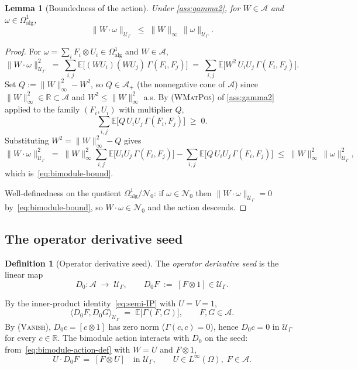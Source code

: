 \documentclass[11pt,reqno]{amsart}
\theoremstyle{plain}
\newtheorem{lemma}[theorem]{Lemma}
\theoremstyle{definition}
\newtheorem{definition}[theorem]{Definition}
\theoremstyle{remark}
\newcommand{\R}{\mathbb{R}}
\newcommand{\E}{\mathbb{E}}
\newcommand{\cA}{\mathcal A}
\newcommand{\cU}{\mathcal U}
\begin{document}
\begin{lemma}[Boundedness of the action]\label{lem:bimodule-bounded}
Under \cref{ass:gamma2}, for $W\in\cA$ and
$\omega\in\Omega^{1}_{\mathrm{alg}}$,
\begin{equation}\label{eq:bimodule-bound}
  \|W\cdot\omega\|_{\cU_{\Gamma}}\;\le\;\|W\|_{\infty}\,\|\omega\|_{\cU_{\Gamma}}.
\end{equation}
\end{lemma}

\begin{proof}
For $\omega=\sum_{i}F_{i}\otimes U_{i}\in\Omega^{1}_{\mathrm{alg}}$
and $W\in\cA$,
\[
  \|W\cdot\omega\|_{\cU_{\Gamma}}^{2}
  \;=\;\sum_{i,j}\E\!\bigl[(WU_{i})(WU_{j})\,\Gamma(F_{i},F_{j})\bigr]
  \;=\;\sum_{i,j}\E\!\bigl[W^{2}\,U_{i}U_{j}\,\Gamma(F_{i},F_{j})\bigr].
\]
Set $Q:=\|W\|_{\infty}^{2}-W^{2}$, so $Q\in\cA_{+}$ (the
nonnegative cone of $\cA$) since $\|W\|_{\infty}^{2}\in\R\subset\cA$
and $W^{2}\le\|W\|_{\infty}^{2}$ a.s. By \textsc{(WMatPos)} of
\cref{ass:gamma2} applied to the family $(F_{i},U_{i})$ with
multiplier $Q$,
\[
  \sum_{i,j}\E\!\bigl[Q\,U_{i}U_{j}\,\Gamma(F_{i},F_{j})\bigr]\;\ge\;0.
\]
Substituting $W^{2}=\|W\|_{\infty}^{2}-Q$ gives
\[
  \|W\cdot\omega\|_{\cU_{\Gamma}}^{2}
  \;=\;\|W\|_{\infty}^{2}\sum_{i,j}\E\!\bigl[U_{i}U_{j}\,\Gamma(F_{i},F_{j})\bigr]
       -\sum_{i,j}\E\!\bigl[Q\,U_{i}U_{j}\,\Gamma(F_{i},F_{j})\bigr]
  \;\le\;\|W\|_{\infty}^{2}\,\|\omega\|_{\cU_{\Gamma}}^{2},
\]
which is~\eqref{eq:bimodule-bound}.

Well-definedness on the quotient
$\Omega^{1}_{\mathrm{alg}}/\mathcal N_{0}$: if
$\omega\in\mathcal N_{0}$ then $\|W\cdot\omega\|_{\cU_{\Gamma}}=0$
by~\eqref{eq:bimodule-bound}, so $W\cdot\omega\in\mathcal N_{0}$
and the action descends.
\end{proof}

\subsection{The operator derivative seed}\label{sec:moduleA-D0}

\begin{definition}[Operator derivative seed]\label{def:D0}
The \emph{operator derivative seed} is the linear map
\[
  D_{0}\colon\cA\;\to\;\cU_{\Gamma},
  \qquad
  D_{0}F\;:=\;[F\otimes 1]\in\cU_{\Gamma}.
\]
\end{definition}

By the inner-product identity~\eqref{eq:semi-IP} with $U=V=1$,
\begin{equation}\label{eq:D0-isometry}
  \langle D_{0}F,D_{0}G\rangle_{\cU_{\Gamma}}
  \;=\;\E\!\bigl[\Gamma(F,G)\bigr],
  \qquad F,G\in\cA.
\end{equation}
By \textsc{(Vanish)}, $D_{0}c=[c\otimes 1]$ has zero norm
($\Gamma(c,c)=0$), hence $D_{0}c=0$ in $\cU_{\Gamma}$ for every
$c\in\R$. The bimodule action interacts with $D_{0}$ on the
seed: from~\eqref{eq:bimodule-action-def} with $W=U$ and
$F\otimes 1$,
\begin{equation}\label{eq:UdF}
  U\cdot D_{0}F\;=\;[F\otimes U]\quad\text{in }\cU_{\Gamma},
  \qquad U\in L^{\infty}(\Omega),\;F\in\cA.
\end{equation}
\end{document}

